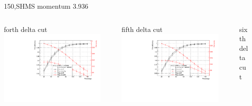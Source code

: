 \documentclass[aspectratio=169,xcolor=dvipsnames]{beamer}
\begin{document}
\begin{frame}{150,SHMS momentum 3.936}
\begin{columns}
\begin{column}[T]{0.3\textwidth}
\end{column}
\end{columns}
\begin{columns}
\begin{column}[T]{0.3\textwidth}
forth delta cut \\
\includegraphics[width = 0.9\textwidth]{results/pid/SHMS_rf_150_3_pos.pdf}
\end{column}
\begin{column}[T]{0.3\textwidth}
fifth delta cut \\
\includegraphics[width = 0.9\textwidth]{results/pid/SHMS_rf_150_4_pos.pdf}
\end{column}
\begin{column}[T]{0.3\textwidth}
sixth delta cut \\

\end{column}
\end{columns}
\end{frame}
\end{document}

